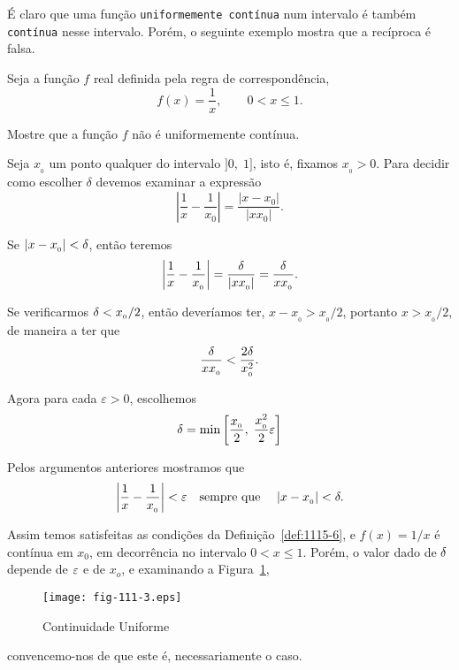 É claro que uma função \texttt{uniformemente contínua} num intervalo é também \texttt{contínua} nesse intervalo. Porém, o seguinte exemplo mostra que a recíproca é falsa.

\begin{exer}
Seja a função $f$ real definida pela regra de correspondência,
\begin{equation*}
f(x) = \frac{1}{x}, \qquad 0 < x \le 1.  
\end{equation*}

Mostre que a função $f$ não é uniformemente contínua.
\end{exer}

\solo Seja $x_{_{0}}$ um ponto qualquer do intervalo $]0, \;1]$, isto é, fixamos $x_{_{0}}>0$. Para decidir como escolher $\delta$ devemos examinar a expressão
\begin{equation*}
  \left|\frac{1}{x}-\frac{1}{x_{0}}\right|=\frac{|x-x_{0}|}{|xx_{0}|}.
\end{equation*}

Se $|x-x_{_{0}}|<\delta$, então teremos
\begin{equation*}
  \left|\frac{1}{x}-\frac{1}{x_{_{0}}}\right|=\frac{\delta}{|xx_{_{0}}|}=\frac{\delta}{xx_{_{0}}}.
\end{equation*}

Se verificarmos $\delta<x_{_{0}}/2$, então deveríamos ter, $x-x_{_{0}}>x_{_{0}}/2$, portanto $x >x_{_{0}}/2$, de maneira  a ter que
\begin{equation*}
\frac{\delta}{xx_{_{0}}}<\frac{2\delta}{x_{_{0}}^2}.
\end{equation*}

Agora para cada $\varepsilon>0$, escolhemos
\begin{equation*}
  \delta=\min\left[\frac{x_{_{0}}}{2}, \;\frac{x_{_{0}}^2}{2}\varepsilon \right]
\end{equation*}

Pelos argumentos anteriores mostramos que
\begin{equation*}
  \left|\frac{1}{x}-\frac{1}{x_{_{0}}}\right|<\varepsilon\quad \text{sempre que }
  \quad |x-x_{_{0}}|<\delta.
\end{equation*}

Assim temos satisfeitas as condições da Definição~\ref{def:1115-6}, e $f(x) = 1/x$ é contínua
em $x_{0}$, em decorrência no intervalo $0 < x \le 1$. Porém, o valor dado de $\delta$ 
depende de $\varepsilon$ e de $x_o$, e examinando a Figura~\ref{fig-111-3},
\begin{figure}[H]
\centering
\texttt{[image: fig-111-3.eps]}
\caption{Continuidade Uniforme}
\label{fig-111-3}
\end{figure}
convencemo-nos de que este é, necessariamente o caso.

